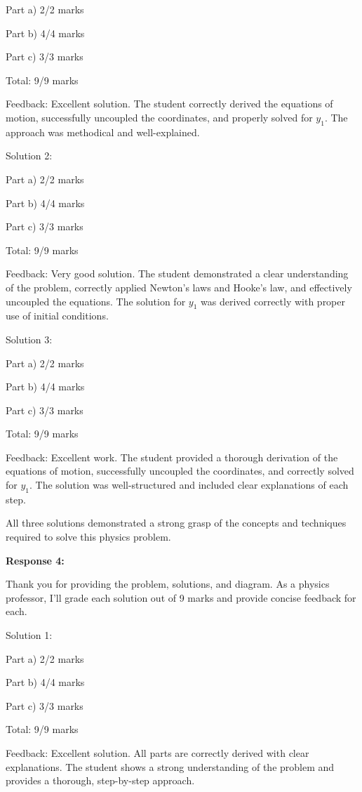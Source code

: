 \documentclass[a4paper,11pt]{article}
\begin{document}
Part a) 2/2 marks

Part b) 4/4 marks

Part c) 3/3 marks

Total: 9/9 marks

Feedback: Excellent solution. The student correctly derived the equations of motion, successfully uncoupled the coordinates, and properly solved for \(y_1\). The approach was methodical and well-explained.

Solution 2:

Part a) 2/2 marks

Part b) 4/4 marks

Part c) 3/3 marks

Total: 9/9 marks

Feedback: Very good solution. The student demonstrated a clear understanding of the problem, correctly applied Newton's laws and Hooke's law, and effectively uncoupled the equations. The solution for \(y_1\) was derived correctly with proper use of initial conditions.

Solution 3:

Part a) 2/2 marks

Part b) 4/4 marks

Part c) 3/3 marks

Total: 9/9 marks

Feedback: Excellent work. The student provided a thorough derivation of the equations of motion, successfully uncoupled the coordinates, and correctly solved for \(y_1\). The solution was well-structured and included clear explanations of each step.

All three solutions demonstrated a strong grasp of the concepts and techniques required to solve this physics problem.

\bigskip
\textbf{Response 4:}

Thank you for providing the problem, solutions, and diagram. As a physics professor, I'll grade each solution out of 9 marks and provide concise feedback for each.

Solution 1:

Part a) 2/2 marks

Part b) 4/4 marks

Part c) 3/3 marks

Total: 9/9 marks

Feedback: Excellent solution. All parts are correctly derived with clear explanations. The student shows a strong understanding of the problem and provides a thorough, step-by-step approach.
\end{document}
